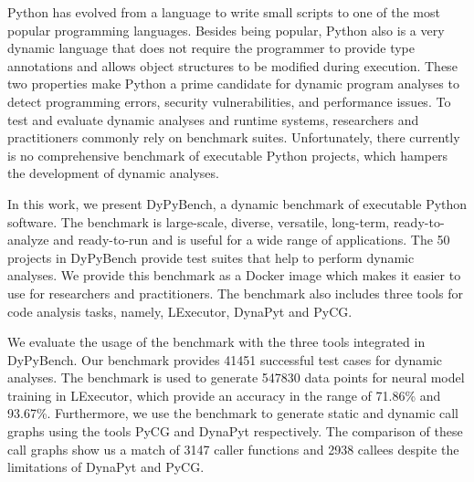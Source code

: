 Python has evolved from a language to write small scripts to one of the most popular programming languages.
Besides being popular, Python also is a very dynamic language that does not require the programmer to provide type annotations and allows object structures to be modified during execution.
These two properties make Python a prime candidate for dynamic program analyses to detect programming errors, security vulnerabilities, and performance issues.
To test and evaluate dynamic analyses and runtime systems, researchers and practitioners commonly rely on benchmark suites.
Unfortunately, there currently is no comprehensive benchmark of executable Python projects, which hampers the development of dynamic analyses.

In this work, we present DyPyBench, a dynamic benchmark of executable Python software.
The benchmark is large-scale, diverse, versatile, long-term, ready-to-analyze and ready-to-run and is useful for a wide range of applications. 
The 50 projects in DyPyBench provide test suites that help to perform dynamic analyses.
We provide this benchmark as a Docker image which makes it easier to use for researchers and practitioners.
The benchmark also includes three tools for code analysis tasks, namely, LExecutor, DynaPyt and PyCG.

We evaluate the usage of the benchmark with the three tools integrated in DyPyBench.
Our benchmark provides 41451 successful test cases for dynamic analyses.
The benchmark is used to generate 547830 data points for neural model training in LExecutor, which provide an accuracy in the range of 71.86\% and 93.67\%.
Furthermore, we use the benchmark to generate static and dynamic call graphs using the tools PyCG and DynaPyt respectively.
The comparison of these call graphs show us a match of 3147 caller functions and 2938 callees despite the limitations of DynaPyt and PyCG.
